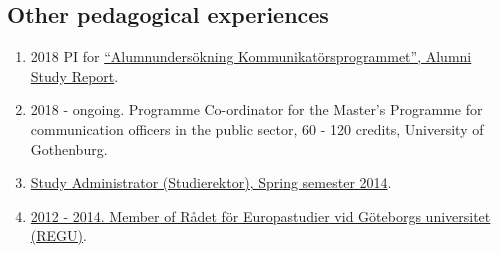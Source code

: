 \documentclass[
]{article}
\providecommand{\tightlist}{%
  \setlength{\itemsep}{0pt}\setlength{\parskip}{0pt}}
\begin{document}
\hypertarget{other-pedagogical-experiences}{%
\subsection{Other pedagogical
experiences}\label{other-pedagogical-experiences}}

\begin{enumerate}
\def\labelenumi{\arabic{enumi}.}
\tightlist
\item
  2018 PI for
  \href{https://gup.ub.gu.se/publication/273029}{``Alumnundersökning
  Kommunikatörsprogrammet'', Alumni Study Report}.
\item
  2018 - ongoing. Programme Co-ordinator for the Master's Programme for
  communication officers in the public sector, 60 - 120 credits,
  University of Gothenburg.
\item
  \href{http://files.christopherkullenberg.se/studierektoronline.pdf}{Study
  Administrator (Studierektor), Spring semester 2014}.
\item
  \href{http://files.christopherkullenberg.se/IntygREGU.pdf}{2012 -
  2014. Member of Rådet för Europastudier vid Göteborgs universitet
  (REGU)}.
\end{enumerate}
\end{document}
